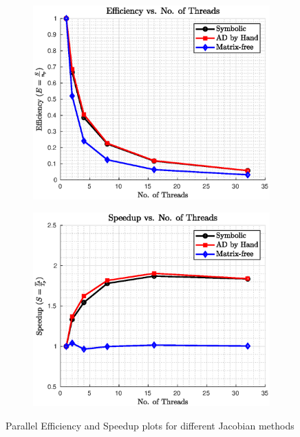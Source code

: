 \documentclass[11pt]{scrartcl}
\begin{document}
\begin{figure}[H]
	\centering
	\begin{subfigure}[b]{0.48\linewidth}
		\includegraphics[width=\linewidth]{./figs/efficiency.eps}
	\end{subfigure}
	\begin{subfigure}[b]{0.48\linewidth}
		\includegraphics[width=\linewidth]{./figs/speedup.eps}
	\end{subfigure}
	\caption{Parallel Efficiency and Speedup plots for different Jacobian methods}\label{fig: Timing}
\end{figure}
\end{document}
